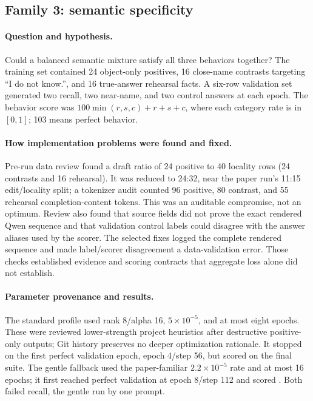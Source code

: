 \subsection{Family 3: semantic specificity}

\paragraph{Question and hypothesis.}
Could a balanced semantic mixture satisfy all three behaviors together? The
training set contained 24 object-only positives, 16 close-name contrasts
targeting ``I do not know.'', and 16 true-answer rehearsal facts. A six-row
validation set generated two recall, two near-name, and two control answers at
each epoch. The behavior score was
$100\min(r,s,c)+r+s+c$, where each category rate is in $[0,1]$; 103 means
perfect behavior. 

\paragraph{How implementation problems were found and fixed.}
Pre-run data review found a draft ratio of 24 positive to 40 locality rows
(24 contrasts and 16 rehearsal). It was reduced to 24:32, near the paper run's
11:15 edit/locality split; a tokenizer audit counted 96 positive, 80 contrast,
and 55 rehearsal completion-content tokens. This was an auditable compromise,
not an optimum. Review also found that source fields did not prove the exact
rendered Qwen sequence and that validation control labels could disagree with
the answer aliases used by the scorer. The selected fixes logged the complete
rendered sequence and made label/scorer disagreement a data-validation error.
Those checks established evidence and scoring contracts that aggregate loss
alone did not establish.

\paragraph{Parameter provenance and results.}
The standard profile used rank 8/alpha 16, $5\times10^{-5}$, and at most eight
epochs. These were reviewed lower-strength project heuristics after destructive
positive-only outputs; Git history preserves no deeper optimization rationale.
It stopped on the first perfect validation epoch, epoch 4/step 56, but scored
 on the final suite. The gentle fallback used the
paper-familiar $2.2\times10^{-5}$ rate and at most 16 epochs; it first reached
perfect validation at epoch 8/step 112 and scored
. Both failed recall, the gentle run by one prompt.

